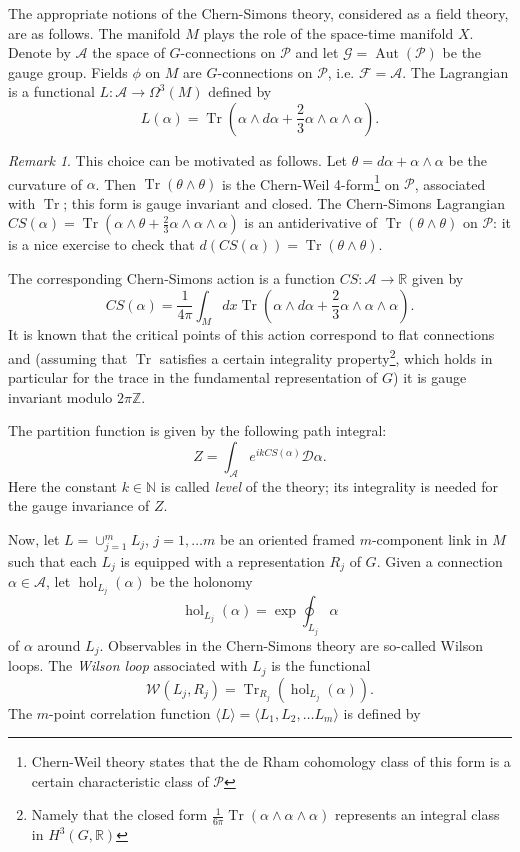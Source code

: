 \documentclass[10pt]{amsart}
\theoremstyle{definition}
\theoremstyle{remark}
\newtheorem{rem}[thm]{Remark}
\newcommand{\N}{\mathbb N}
\newcommand{\R}{\mathbb R}
\newcommand{\Z}{\mathbb Z}
\newcommand{\no}{\noindent}
\def\<{\langle}
\def\>{\rangle}
\newcommand{\cA}{\mathcal{A}}
\newcommand{\cD}{\mathcal{D}}
\newcommand{\cF}{\mathcal{F}}
\newcommand{\cG}{\mathcal{G}}
\newcommand{\cP}{\mathcal{P}}
\newcommand{\cW}{\mathcal{W}}
\newcommand{\Ga}{\alpha}
\newcommand{\GO}{\Omega}
\newcommand{\Gp}{\phi}
\newcommand{\Gt}{\theta}
\newcommand{\Aut}{\operatorname{Aut}}
\newcommand{\hol}{\operatorname{hol}}
\newcommand{\Tr}{\operatorname{Tr}}
\begin{document}
The appropriate notions of the Chern-Simons theory, considered as
a field theory, are as follows. The manifold $M$ plays the role of
the space-time manifold $X$. Denote by $\cA$ the space of
$G$-connections on $\cP$ and let $\cG=\Aut(\cP)$ be the gauge
group. Fields $\Gp$ on $M$ are $G$-connections on $\cP$, i.e.
$\cF=\cA$.
The Lagrangian is a functional $L:\cA\to\GO^3(M)$ defined by
$$
   L(\Ga)=\Tr(\Ga\wedge d\Ga+\frac23\Ga\wedge\Ga\wedge\Ga).
$$
\begin{rem}

This choice can be motivated as follows.
Let $\Gt=d\Ga+\Ga\wedge\Ga$ be the curvature of $\Ga$.
Then $\Tr(\Gt\wedge\Gt)$ is the Chern-Weil 4-form\footnote{
Chern-Weil theory states that the de Rham cohomology class
of this form is a certain characteristic class of $\cP$}
on $\cP$, associated with $\Tr$; this form
is gauge invariant and closed. The Chern-Simons Lagrangian
$\displaystyle{CS(\Ga)=\Tr(\Ga\wedge\Gt+\frac23\Ga\wedge\Ga\wedge\Ga)}$
is an antiderivative of $\Tr(\Gt\wedge\Gt)$ on $\cP$:
it is a nice exercise to check that $d(CS(\Ga))=\Tr(\Gt\wedge\Gt)$.
\end{rem}

The corresponding Chern-Simons action is a function $CS:\cA\to\R$
given by
$$
CS(\Ga)=\frac{1}{4\pi}\int_M dx\Tr(\Ga\wedge d\Ga+\frac23\Ga\wedge\Ga\wedge\Ga).
$$
It is known that the critical points of this action correspond to flat
connections and (assuming that $\Tr$ satisfies a certain integrality
property\footnote{Namely that the closed form $\frac1{6\pi}
\Tr(\Ga\wedge\Ga\wedge\Ga)$ represents an integral class in
$H^3(G,\R)$}, which holds in particular for the trace in the fundamental
representation of $G$) it is gauge invariant modulo $2\pi\Z$.

The partition function is given by the following path integral:
\begin{equation}\label{eqZ}
Z=\int_{\cA} e^{ik CS(\Ga)}\cD\Ga.
\end{equation}
\no Here the constant $k\in\N$ is called {\em level} of the theory;
its integrality is needed for the gauge invariance of $Z$.

Now, let $L=\cup_{j=1}^m L_j$, $j=1,\dots m$ be an oriented framed
$m$-component link in $M$ such that each $L_j$ is equipped with a
representation $R_j$ of $G$. Given a connection $\Ga\in\cA$, let
$\hol_{L_j}(\Ga)$ be the holonomy
\begin{equation}\label{eq:hol}
      \hol_{L_j}(\Ga)=\exp\oint_{L_j} \Ga
\end{equation}
of $\Ga$ around $L_j$.
Observables in the Chern-Simons theory are so-called Wilson loops.
The {\em Wilson loop} associated with $L_j$ is the functional
$$
           \cW(L_j,R_j)=\Tr_{R_j}(\hol_{L_j}(\Ga)).
$$
The $m$-point correlation function $\<L\>=\<L_1,L_2,\dots L_m\>$
is defined by
\end{document}
